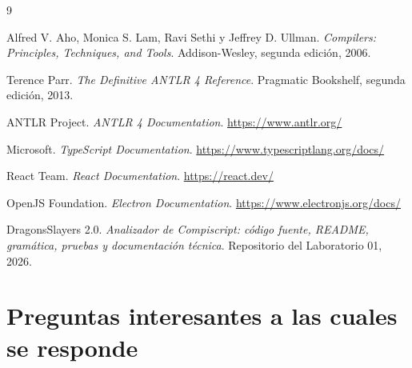 \documentclass[12pt,letterpaper,oneside]{report}
\begin{document}
\begingroup
\renewcommand{\bibname}{Referencias}
\small
\setlength{\parskip}{0pt}
\begin{thebibliography}{9}
\setlength{\itemsep}{0.45em}
\setlength{\parsep}{0pt}

Alfred V. Aho, Monica S. Lam, Ravi Sethi y Jeffrey D. Ullman.
\textit{Compilers: Principles, Techniques, and Tools}.
Addison-Wesley, segunda edición, 2006.

Terence Parr.
\textit{The Definitive ANTLR 4 Reference}.
Pragmatic Bookshelf, segunda edición, 2013.

ANTLR Project.
\textit{ANTLR 4 Documentation}.
\url{https://www.antlr.org/}

Microsoft.
\textit{TypeScript Documentation}.
\url{https://www.typescriptlang.org/docs/}

React Team.
\textit{React Documentation}.
\url{https://react.dev/}

OpenJS Foundation.
\textit{Electron Documentation}.
\url{https://www.electronjs.org/docs/}

DragonsSlayers 2.0.
\textit{Analizador de Compiscript: código fuente, README, gramática, pruebas y documentación técnica}.
Repositorio del Laboratorio 01, 2026.

\end{thebibliography}
\endgroup

\appendix
\chapter{Preguntas interesantes a las cuales se responde}
\end{document}
